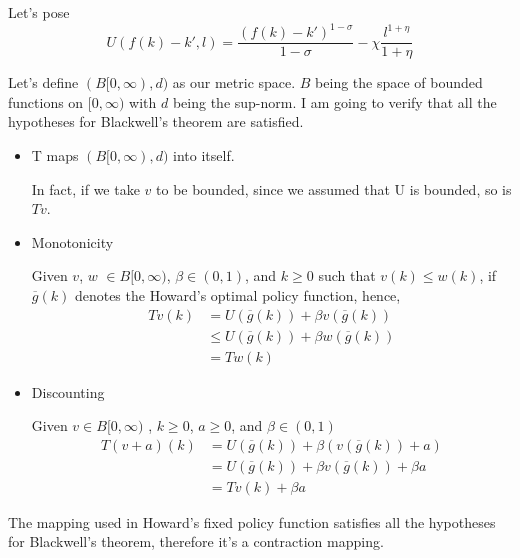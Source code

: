 \documentclass[12pt,a4paper]{article}
\begin{document}
Let's pose 
\begin{equation*}
U(f(k)-k', l)=\frac{(f(k)-k')^{1-\sigma}}{1-\sigma}-\chi \frac{l^{1+\eta}}{1+\eta}
\end{equation*}

Let's define $(B[0,\infty),d)$ as our metric space. $B$ being the space of bounded functions on $[0, \infty)$ with $d$ being the sup-norm. I am going to verify that all the hypotheses for Blackwell’s theorem are satisfied.

\begin{itemize}
\item T maps $(B[0,\infty),d)$ into itself. 

In fact, if we take $v$ to be bounded, since we
assumed that U is bounded, so is $Tv$.
\item Monotonicity

Given $v$, $w$  $\in  B[0,\infty)$, $\beta \in (0,1)$, and $k \geq 0$ such that $v(k) \leq w(k)$, if $\overline{g}(k)$ denotes the Howard's optimal policy function, hence,
\begin{equation}
\begin{split}
Tv(k) &=  U(\overline{g}(k))+\beta v(\overline{g}(k))\\
&\leq U(\overline{g}(k))+\beta w(\overline{g}(k))\\
&= Tw(k)
\end{split}
\end{equation}
\item Discounting

Given $v \in B[0,\infty)$ , $k \geq 0$, $a \geq 0$, and $\beta \in (0,1)$
\begin{equation}
\begin{split}
T(v+a)(k) &=  U(\overline{g}(k))+\beta (v(\overline{g}(k))+a)\\
&= U(\overline{g}(k))+\beta v(\overline{g}(k))+\beta a\\
&= Tv(k) + \beta a
\end{split}
\end{equation}
\end{itemize}

The mapping used in Howard's fixed policy function satisfies all the hypotheses for Blackwell’s theorem, therefore it's a contraction mapping.
\end{document}
